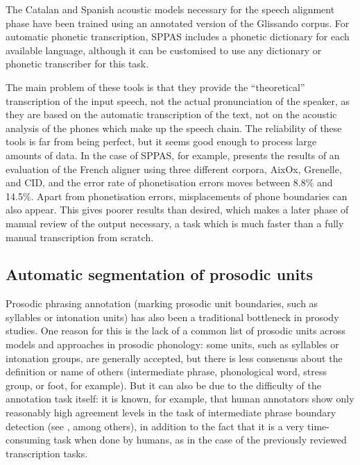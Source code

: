 \documentclass[output=paper]{langsci/langscibook}
\begin{document}
The Catalan and Spanish acoustic models necessary for the speech alignment phase have been trained using an annotated version of the Glissando corpus. For automatic phonetic transcription, SPPAS includes a phonetic dictionary for each available language, although it can be customised to use any dictionary or phonetic transcriber for this task.\largerpage

The main problem of these tools is that they provide the ``theoretical'' transcription of the input speech, not the actual pronunciation of the speaker, as they are based on the automatic transcription of the text, not on the acoustic analysis of the phones which make up the speech chain. The reliability of these tools is far from being perfect, but it seems good enough to process large amounts of data. In the case of SPPAS, for example, \citet{Bigi2012SPPAS} presents the results of an evaluation of the French aligner using three different corpora, AixOx, Grenelle, and CID, and the error rate of phonetisation errors moves between 8.8\% and 14.5\%. Apart from phonetisation errors, misplacements of phone boundaries can also appear. This gives poorer results than desired, which makes a later phase of manual review of the output necessary, a task which is much faster than a fully manual transcription from scratch.

\subsection{Automatic segmentation of prosodic units}

Prosodic phrasing annotation (marking prosodic unit boundaries, such as syllables or intonation units) has also been a traditional bottleneck in prosody studies. One reason for this is the lack of a common list of prosodic units across models and approaches in prosodic phonology: some units, such as syllables or intonation groups, are generally accepted, but there is less consensus about the definition or name of others (intermediate phrase, phonological word, stress group, or foot, for example). But it can also be due to the difficulty of the annotation task itself: it is known, for example, that human annotators show only reasonably high agreement levels in the task of intermediate phrase boundary detection (see \citealt{Syrdal2000}, among others), in addition to the fact that it is a very time-consuming task when done by humans, as in the case of the previously reviewed transcription tasks.
\end{document}
